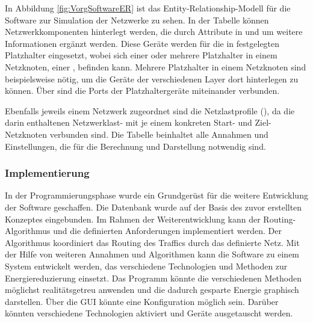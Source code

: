 In Abbildung \ref{fig:VorgSoftwareER} ist das Entity-Relationship-Modell für die Software zur Simulation der Netzwerke zu sehen. In der Tabelle  können Netzwerkkomponenten hinterlegt werden, die durch Attribute in  und  um weitere Informationen ergänzt werden. Diese Geräte werden für die in  festgelegten Platzhalter eingesetzt, wobei sich einer oder mehrere Platzhalter in einem Netzknoten, einer , befinden kann. Mehrere Platzhalter in einem Netzknoten sind beispielsweise nötig, um die Geräte der verschiedenen Layer dort hinterlegen zu können. Über  sind die Ports der Platzhaltergeräte miteinander verbunden.

Ebenfalls jeweils einem Netzwerk zugeordnet sind die Netzlastprofile (), da die darin enthaltenen Netzwerklast- mit je einem konkreten Start- und Ziel-Netzknoten verbunden sind. Die Tabelle  beinhaltet alle Annahmen und Einstellungen, die für die Berechnung und Darstellung notwendig sind. 

\subsubsection{Implementierung}
In der Programmierungsphase wurde ein Grundgerüst für die weitere Entwicklung der Software geschaffen. Die Datenbank wurde auf der Basis des zuvor erstellten Konzeptes eingebunden. Im Rahmen der Weiterentwicklung kann der Routing-Algorithmus und die definierten Anforderungen implementiert werden. Der Algorithmus koordiniert das Routing des Traffics durch das definierte Netz. Mit der Hilfe von weiteren Annahmen und Algorithmen kann die Software zu einem System entwickelt werden, das verschiedene Technologien und Methoden zur Energiereduzierung einsetzt. Das Programm könnte die verschiedenen Methoden möglichst realitätsgetreu anwenden und die dadurch gesparte Energie graphisch darstellen. Über die GUI könnte eine Konfiguration möglich sein.  Darüber könnten verschiedene Technologien aktiviert und Geräte ausgetauscht werden. 

